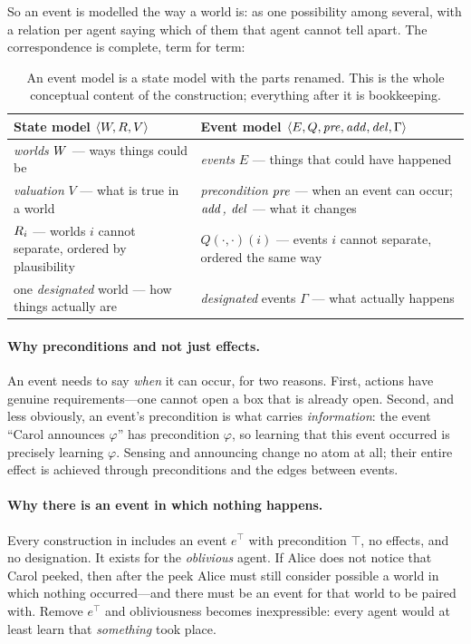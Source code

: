 \documentclass[11pt,a4paper]{article}
\begin{document}
So an event is modelled the way a world is: as one possibility among several, with a relation
per agent saying which of them that agent cannot tell apart. The correspondence is complete,
term for term:

\begin{table}[htbp]
\centering
\begin{tabular}{@{}p{}p{}@{}}
\toprule
\textbf{State model} $\langle W, R, V\rangle$ & \textbf{Event model} $\langle E, Q,
\mathit{pre}, \mathit{add}, \mathit{del}, \Gamma\rangle$ \\
\midrule
\emph{worlds} $W$ --- ways things could be &
\emph{events} $E$ --- things that could have happened \\[0.3em]
\emph{valuation} $V$ --- what is true in a world &
\emph{precondition} $\mathit{pre}$ --- when an event can occur; \emph{$\mathit{add}$, $\mathit{del}$} --- what it
changes \\[0.3em]
$R_{i}$ --- worlds $i$ cannot separate, ordered by plausibility &
$Q(\cdot,\cdot)(i)$ --- events $i$ cannot separate, ordered the same way \\[0.3em]
one \emph{designated} world --- how things actually are &
\emph{designated} events $\Gamma$ --- what actually happens \\
\bottomrule
\end{tabular}
\caption{An event model is a state model with the parts renamed. This is the whole
conceptual content of the construction; everything after it is bookkeeping.}
\label{tab:analogy}
\end{table}

\paragraph{Why preconditions and not just effects.}
An event needs to say \emph{when} it can occur, for two reasons. First, actions have
genuine requirements---one cannot open a box that is already open. Second, and less
obviously, an event's precondition is what carries \emph{information}: the event ``Carol
announces $\varphi$'' has precondition $\varphi$, so learning that this event occurred is
precisely learning $\varphi$. Sensing and announcing change no atom at all; their entire
effect is achieved through preconditions and the edges between events.

\paragraph{Why there is an event in which nothing happens.}
Every construction in  includes an event $e^{\top}$ with precondition
$\top$, no effects, and no designation. It exists for the \emph{oblivious} agent. If Alice
does not notice that Carol peeked, then after the peek Alice must still consider possible a
world in which nothing occurred---and there must be an event for that world to be paired
with. Remove $e^{\top}$ and obliviousness becomes inexpressible: every agent would at least
learn that \emph{something} took place.
\end{document}
